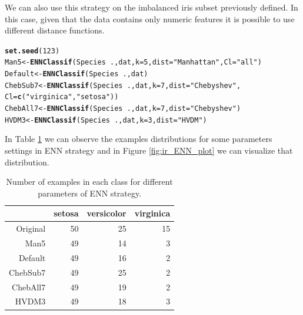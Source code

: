 \documentclass[10pt,a4paper]{article}\usepackage[]{graphicx}\usepackage[]{color}
\makeatletter
\newcommand{\hlnum}[1]{\textcolor[rgb]{0.686,0.059,0.569}{#1}}%
\newcommand{\hlstr}[1]{\textcolor[rgb]{0.192,0.494,0.8}{#1}}%
\newcommand{\hlopt}[1]{\textcolor[rgb]{0,0,0}{#1}}%
\newcommand{\hlstd}[1]{\textcolor[rgb]{0.345,0.345,0.345}{#1}}%
\newcommand{\hlkwb}[1]{\textcolor[rgb]{0.69,0.353,0.396}{#1}}%
\newcommand{\hlkwc}[1]{\textcolor[rgb]{0.333,0.667,0.333}{#1}}%
\newcommand{\hlkwd}[1]{\textcolor[rgb]{0.737,0.353,0.396}{\textbf{#1}}}%
\newenvironment{kframe}{%
 \def\at@end@of@kframe{}%
 \ifinner\ifhmode%
  \def\at@end@of@kframe{\end{minipage}}%
  \begin{minipage}{\columnwidth}%
 \fi\fi%
 \def\FrameCommand##1{\hskip\@totalleftmargin \hskip-\fboxsep
 \colorbox{shadecolor}{##1}\hskip-\fboxsep
     \hskip-\linewidth \hskip-\@totalleftmargin \hskip\columnwidth}%
 \MakeFramed {\advance\hsize-\width
   \@totalleftmargin\z@ \linewidth\hsize
   \@setminipage}}%
 {\par\unskip\endMakeFramed%
 \at@end@of@kframe}
\newenvironment{knitrout}{}{} %
\makeatother
\begin{document}
We can also use this strategy on the imbalanced iris subset previously defined. In this case, given that the data contains only numeric features it is possible to use different distance functions.


\begin{knitrout}\footnotesize
{}\color{fgcolor}\begin{kframe}
\begin{alltt}
  \hlkwd{set.seed}\hlstd{(}\hlnum{123}\hlstd{)}
  \hlstd{Man5} \hlkwb{<-} \hlkwd{ENNClassif}\hlstd{(Species}\hlopt{~}\hlstd{., dat,} \hlkwc{k}\hlstd{=}\hlnum{5}\hlstd{,} \hlkwc{dist}\hlstd{=}\hlstr{"Manhattan"}\hlstd{,} \hlkwc{Cl}\hlstd{=}\hlstr{"all"}\hlstd{)}
  \hlstd{Default} \hlkwb{<-} \hlkwd{ENNClassif}\hlstd{(Species}\hlopt{~}\hlstd{., dat)}
  \hlstd{ChebSub7} \hlkwb{<-} \hlkwd{ENNClassif}\hlstd{(Species}\hlopt{~}\hlstd{., dat,} \hlkwc{k}\hlstd{=}\hlnum{7}\hlstd{,} \hlkwc{dist}\hlstd{=}\hlstr{"Chebyshev"}\hlstd{,}
                         \hlkwc{Cl}\hlstd{=}\hlkwd{c}\hlstd{(}\hlstr{"virginica"}\hlstd{,} \hlstr{"setosa"}\hlstd{))}
  \hlstd{ChebAll7} \hlkwb{<-} \hlkwd{ENNClassif}\hlstd{(Species}\hlopt{~}\hlstd{., dat,} \hlkwc{k}\hlstd{=}\hlnum{7}\hlstd{,} \hlkwc{dist}\hlstd{=}\hlstr{"Chebyshev"}\hlstd{)}
  \hlstd{HVDM3} \hlkwb{<-} \hlkwd{ENNClassif}\hlstd{(Species}\hlopt{~}\hlstd{., dat,} \hlkwc{k}\hlstd{=}\hlnum{3}\hlstd{,} \hlkwc{dist}\hlstd{=}\hlstr{"HVDM"}\hlstd{)}
\end{alltt}
\end{kframe}
\end{knitrout}

In Table \ref{tab:iris_ENN_table} we can observe the examples distributions for some parameters settings in ENN strategy and in Figure \ref{fig:ir_ENN_plot} we can visualize that distribution.

\begin{table}[ht]
\centering
\begin{tabular}{rrrr}
  \hline
 & setosa & versicolor & virginica \\ 
  \hline
Original &  50 &  25 &  15 \\ 
  Man5 &  49 &  14 &   3 \\ 
  Default &  49 &  16 &   2 \\ 
  ChebSub7 &  49 &  25 &   2 \\ 
  ChebAll7 &  49 &  19 &   2 \\ 
  HVDM3 &  49 &  18 &   3 \\ 
   \hline
\end{tabular}
\caption{Number of examples in each class for different parameters of ENN strategy.} 
\label{tab:iris_ENN_table}
\end{table}
\end{document}

